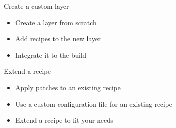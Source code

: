 \setuplabframe
{Create a custom layer}
{
  \begin{itemize}
    \item Create a layer from scratch
    \item Add recipes to the new layer
    \item Integrate it to the build
  \end{itemize}
}

\setuplabframe
{Extend a recipe}
{
  \begin{itemize}
    \item Apply patches to an existing recipe
    \item Use a custom configuration file for an existing recipe
    \item Extend a recipe to fit your needs
  \end{itemize}
}
